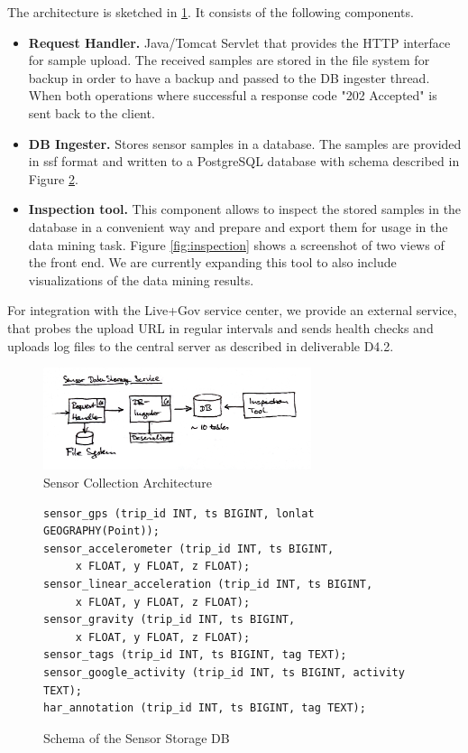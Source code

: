 The architecture is sketched in \ref{fig:ss_architecture}. It consists
of the following components.
\begin{itemize}
\item {\bf Request Handler.} Java/Tomcat Servlet that provides the
  HTTP interface for sample upload. The received samples are stored in
  the file system for backup in order to have a backup and passed to
  the DB ingester thread. When both operations where successful a
  response code "202 Accepted" is sent back to the client.
\item {\bf DB Ingester.} Stores sensor samples in a database. 
  The samples are provided in ssf format and written to a PostgreSQL
  database with schema described in Figure \ref{fig:db_scheme}.
\item {\bf Inspection tool.} This component allows to inspect the
  stored samples in the database in a convenient way and prepare and
  export them for usage in the data mining task. Figure
  \ref{fig:inspection} shows a screenshot of two views of the front
  end. We are currently expanding this tool to also include
  visualizations of the data mining results.
\end{itemize}

For integration with the Live+Gov service center, we provide an
external service, that probes the upload URL in regular intervals and
sends health checks and uploads log files to the central server as
described in deliverable D4.2.

\begin{figure}
\centering
\includegraphics[width=0.7\textwidth]{img/sc/ss_architecture.jpg}
\caption{Sensor Collection Architecture}\label{fig:ss_architecture}
\end{figure}

\begin{figure}
{\small
\begin{verbatim}
sensor_gps (trip_id INT, ts BIGINT, lonlat GEOGRAPHY(Point));
sensor_accelerometer (trip_id INT, ts BIGINT, 
     x FLOAT, y FLOAT, z FLOAT);
sensor_linear_acceleration (trip_id INT, ts BIGINT,
     x FLOAT, y FLOAT, z FLOAT);
sensor_gravity (trip_id INT, ts BIGINT, 
     x FLOAT, y FLOAT, z FLOAT);
sensor_tags (trip_id INT, ts BIGINT, tag TEXT);
sensor_google_activity (trip_id INT, ts BIGINT, activity TEXT);
har_annotation (trip_id INT, ts BIGINT, tag TEXT);
\end{verbatim}}
\label{fig:db_scheme}
\caption{Schema of the Sensor Storage DB}
\end{figure}

